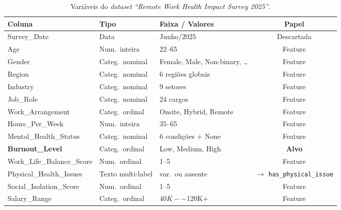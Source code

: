 \documentclass[conference]{IEEEtran}
\newcommand{\fonte}[1][elaborado pelos autores.]{%
\par\vspace{1pt}{\footnotesize\centering Fonte: #1\par}}
\begin{document}
\begin{table}[!t]
\centering
\small
\setlength{\tabcolsep}{4pt}
\caption{Variáveis do \textit{dataset} \textit{``Remote Work Health Impact Survey 2025''}.}
\label{tab:features}
\begin{tabular}{lllc}
\toprule
\textbf{Coluna}            & \textbf{Tipo}     & \textbf{Faixa / Valores}         & \textbf{Papel}                      \\
\midrule
Survey_Date               & Data              & Junho/2025                       & Descartada                          \\
Age                        & Num.\ inteira     & 22--65                           & Feature                             \\
Gender                     & Categ.\ nominal   & Female, Male, Non-binary, \ldots & Feature                             \\
Region                     & Categ.\ nominal   & 6 regiões globais                & Feature                             \\
Industry                   & Categ.\ nominal   & 9 setores                        & Feature                             \\
Job_Role                  & Categ.\ nominal   & 24 cargos                        & Feature                             \\
Work_Arrangement          & Categ.\ ordinal   & Onsite, Hybrid, Remote           & Feature                             \\
Hours_Per_Week           & Num.\ inteira     & 35--65                           & Feature                             \\
Mental_Health_Status     & Categ.\ nominal   & 6 condições + None               & Feature                             \\
\textbf{Burnout_Level}    & Categ.\ ordinal   & Low, Medium, High                & \textbf{Alvo}                       \\
Work_Life_Balance_Score & Num.\ ordinal     & 1--5                             & Feature                             \\
Physical_Health_Issues   & Texto multi-label & var.\ ou ausente                 & $\to$ \texttt{has_physical_issue} \\
Social_Isolation_Score   & Num.\ ordinal     & 1--5                             & Feature                             \\
Salary_Range              & Categ.\ ordinal   & $40K--$120K+                   & Feature                             \\
\bottomrule
\end{tabular}
\fonte
\end{table}
\end{document}
